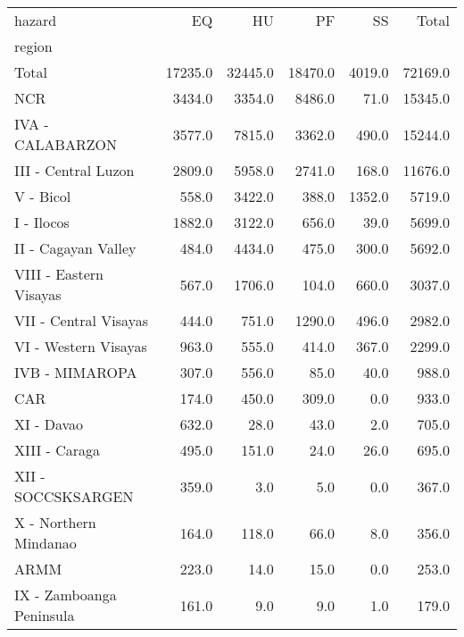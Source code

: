 \begin{tabular}{lrrrrr}
\toprule
hazard &       EQ &       HU &       PF &      SS &    Total \\
region                   &          &          &          &         &          \\
\midrule
Total                    &  17235.0 &  32445.0 &  18470.0 &  4019.0 &  72169.0 \\
NCR                      &   3434.0 &   3354.0 &   8486.0 &    71.0 &  15345.0 \\
IVA - CALABARZON         &   3577.0 &   7815.0 &   3362.0 &   490.0 &  15244.0 \\
III - Central Luzon      &   2809.0 &   5958.0 &   2741.0 &   168.0 &  11676.0 \\
V - Bicol                &    558.0 &   3422.0 &    388.0 &  1352.0 &   5719.0 \\
I - Ilocos               &   1882.0 &   3122.0 &    656.0 &    39.0 &   5699.0 \\
II - Cagayan Valley      &    484.0 &   4434.0 &    475.0 &   300.0 &   5692.0 \\
VIII - Eastern Visayas   &    567.0 &   1706.0 &    104.0 &   660.0 &   3037.0 \\
VII - Central Visayas    &    444.0 &    751.0 &   1290.0 &   496.0 &   2982.0 \\
VI - Western Visayas     &    963.0 &    555.0 &    414.0 &   367.0 &   2299.0 \\
IVB - MIMAROPA           &    307.0 &    556.0 &     85.0 &    40.0 &    988.0 \\
CAR                      &    174.0 &    450.0 &    309.0 &     0.0 &    933.0 \\
XI - Davao               &    632.0 &     28.0 &     43.0 &     2.0 &    705.0 \\
XIII - Caraga            &    495.0 &    151.0 &     24.0 &    26.0 &    695.0 \\
XII - SOCCSKSARGEN       &    359.0 &      3.0 &      5.0 &     0.0 &    367.0 \\
X - Northern Mindanao    &    164.0 &    118.0 &     66.0 &     8.0 &    356.0 \\
ARMM                     &    223.0 &     14.0 &     15.0 &     0.0 &    253.0 \\
IX - Zamboanga Peninsula &    161.0 &      9.0 &      9.0 &     1.0 &    179.0 \\
\bottomrule
\end{tabular}
